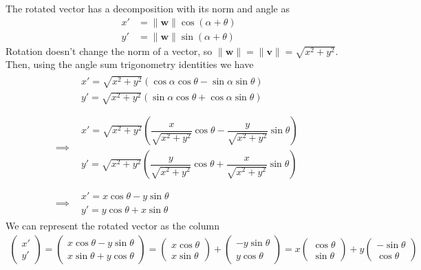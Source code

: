 \noindent The rotated vector has a decomposition with its norm and angle as
\begin{align*}
x' &= \|\mathbf{w}\| \cos(\alpha+\theta)\\
y' &= \|\mathbf{w}\| \sin(\alpha+\theta)
\end{align*}
Rotation doesn't change the norm of a vector, so $\|\mathbf{w}\| = \|\mathbf{v}\| = \sqrt{x^2+y^2}$. Then, using the angle sum trigonometry identities we have
\begin{align*}
&\begin{array}{l}
x' = \sqrt{x^2+y^2} \left( \cos\alpha\cos\theta-\sin\alpha\sin\theta \right)\\
y' = \sqrt{x^2+y^2} \left( \sin\alpha\cos\theta + \cos\alpha\sin\theta \right)
\end{array} \\ \\
\implies
& \begin{array}{l}
x' = \sqrt{x^2+y^2} \left( \dfrac{x}{\sqrt{x^2+y^2}}\cos\theta-\dfrac{y}{\sqrt{x^2+y^2}}\sin\theta \right)\\
y' = \sqrt{x^2+y^2} \left( \dfrac{y}{\sqrt{x^2+y^2}}\cos\theta + \dfrac{x}{\sqrt{x^2+y^2}}\sin\theta \right)
\end{array} \\ \\
\implies
& \begin{array}{l}
x' = x\cos\theta-y\sin\theta \\
y' = y\cos\theta + x\sin\theta 
\end{array}
\end{align*}
We can represent the rotated vector as the column
\begin{align*}
\begin{pmatrix} x' \\ y' \end{pmatrix}
=
\begin{pmatrix} 
x\cos\theta - y\sin\theta \\ 
x\sin\theta + y\cos\theta 
\end{pmatrix}
=
\begin{pmatrix} 
x\cos\theta \\ 
x\sin\theta
\end{pmatrix}
+
\begin{pmatrix} 
- y\sin\theta \\ 
y\cos\theta 
\end{pmatrix}
=
x
\begin{pmatrix} 
\cos\theta \\ 
\sin\theta
\end{pmatrix}
+
y
\begin{pmatrix} 
- \sin\theta \\ 
\cos\theta 
\end{pmatrix}
\end{align*}
